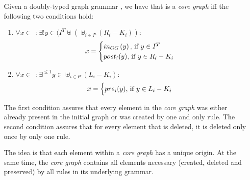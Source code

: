 \begin{definition}\label{def:core-graph} Given a doubly-typed graph grammar \doublyTypedGraphGrammarCore{}, we have that \coreGraph{} is a \emph{core graph} iff the following two conditions hold:

\begin{enumerate}

\item \mbox{$\forall x \in$ \coreGraph $: \exists! y \in (I^T \uplus (\uplus_{i \in P} (R_i - K_i))$}:
\[ x =
    \begin{cases}
      in_{GG}\parens{y},$ if $y \in I^T\\
      post_i(y),$ if $y \in R_i - K_i\\
    \end{cases}
   \]

\item \mbox{$\forall x \in$ \coreGraph $: \exists^{\leq1} y \in \uplus_{i \in P} (L_i - K_i)$}:
\[ x =
    \begin{cases}
      pre_i(y),$ if $y \in L_i - K_i\\
    \end{cases}
   \]\end{enumerate}

  The first condition assures that every element in the \emph{core graph} was either already present in the initial graph or was created by one and only rule. The second condition assures that for every element that is deleted, it is deleted only once by only one rule.
\end{definition}

The idea is that each element within a \emph{core graph} has a unique origin. At the same time, the \emph{core graph} contains all elements necessary (created, deleted and preserved) by all rules in its underlying grammar.


